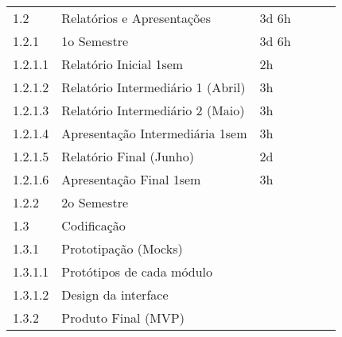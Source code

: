 \begin{table}[H]
\begin{tabular}{llllll}
      1.2      & Relatórios e Apresentações                & 3d 6h     \\
      1.2.1    & 1o Semestre                               & 3d 6h     \\
      1.2.1.1  & Relatório Inicial 1sem                    & 2h        \\
      1.2.1.2  & Relatório Intermediário 1 (Abril)         & 3h        \\
      1.2.1.3  & Relatório Intermediário 2 (Maio)          & 3h        \\
      1.2.1.4  & Apresentação Intermediária 1sem           & 3h        \\
      1.2.1.5  & Relatório Final (Junho)                   & 2d        \\
      1.2.1.6  & Apresentação Final 1sem                   & 3h        \\
      1.2.2    & 2o Semestre                               & ~         \\
      1.3      & Codificação                               & ~         \\
      1.3.1    & Prototipação (Mocks)                      & ~         \\
      1.3.1.1  & Protótipos de cada módulo                 & ~         \\
      1.3.1.2  & Design da interface                       & ~         \\
      1.3.2    & Produto Final (MVP)                       & ~         \\
      
      \bottomrule
    \end{tabular}
  \label{tab:eapwbs}
\end{table}


